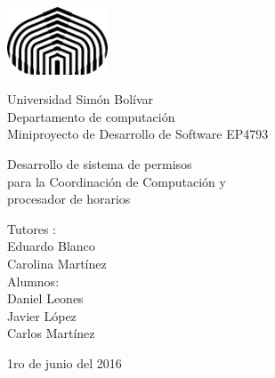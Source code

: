 

\begin{titlepage}

\setlength{\hoffset}{-0.3in}
\setlength{\voffset}{-1in}
\setlength{\topmargin}{1.5cm}
\setlength{\headheight}{0.5cm}
\setlength{\headsep}{1cm}
\setlength{\oddsidemargin}{3cm}
\setlength{\evensidemargin}{3cm}
\setlength{\footskip}{1.5cm}
\enlargethispage{1cm}

\fontsize{12pt}{14pt}
\selectfont

\begin{center}

\includegraphics[height=2cm]{logo.png}

\vspace{0.5cm}

Universidad Sim\'on Bol\'ivar\\
Departamento de computaci\'on\\
Miniproyecto de Desarrollo de Software EP4793\\

\vspace{3.5cm}

\fontsize{17.28pt}{21pt}
\selectfont

Desarrollo de sistema de permisos \\
para la Coordinación de Computación y\\
procesador de horarios

\fontsize{12pt}{14pt}
\selectfont

\vspace{.6cm}



\vspace{.4cm}


\vspace{3cm}

Tutores : \\
Eduardo Blanco\\
Carolina Mart\'inez\\
\vspace{1cm}
Alumnos: \\
Daniel  Leones \\
Javier  L\'opez \\
Carlos Mart\'inez\\


\vspace{1cm}

1ro de junio del 2016

\end{center}
\end{titlepage}


